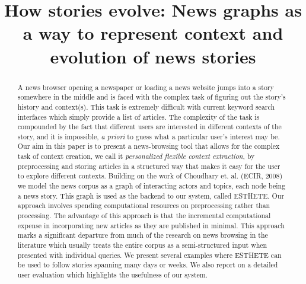 \documentclass{acm_proc_article-sp}
\begin{document}
\title{How stories evolve: News graphs as a way to represent context and evolution of news stories}

%
\author{
%
}


\maketitle
\begin{abstract}
A news browser opening a newspaper or loading a news website jumps
into a story somewhere in the middle and is faced with the complex
task of figuring out the story's history and context(s). This task is
extremely difficult with current keyword search interfaces which
simply provide a list of articles. The complexity of the task is
compounded by the fact that different users are interested in different
contexts of the story, and it is impossible, {\em a priori} to guess
what a particular user's interest may be. Our aim in this paper is to
present a news-browsing tool that allows for the complex task of
context creation, we call it {\em personalized flexible context
  extraction}, by preprocessing and storing articles in a structured
way that makes it easy for the user to explore different
contexts. Building on the work of Choudhary et. al. (ECIR, 2008) we
model the news corpus as a graph of interacting actors and topics,
each node being a news story. This graph is used as the backend to our
system, called ESTHETE.  Our approach involves spending computational
resources on preprocessing rather than processing. The advantage of
this approach is that the incremental computational expense in
incorporating new articles as they are published in minimal. This
approach marks a significant departure from much of the research on
news browsing in the literature which usually treats the entire corpus
as a semi-structured input when presented with individual queries. We
present several examples where ESTHETE can be used to follow stories
spanning many days or weeks. We also report on a detailed user
evaluation which highlights the usefulness of our system.

\end{abstract}
\end{document}
